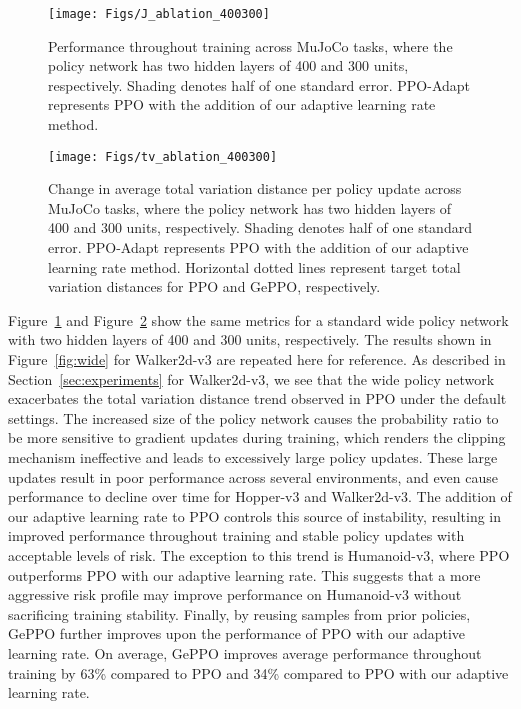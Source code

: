 \documentclass{article}
\begin{document}
\begin{figure}
\centering
\texttt{[image: Figs/J\_ablation\_400300]}
\caption{Performance throughout training across MuJoCo tasks, where the policy network has two hidden layers of 400 and 300 units, respectively. Shading denotes half of one standard error. PPO-Adapt represents PPO with the addition of our adaptive learning rate method.}\label{fig:J_ablation_400300}
\end{figure}

\begin{figure}
\centering
\texttt{[image: Figs/tv\_ablation\_400300]}
\caption{Change in average total variation distance per policy update across MuJoCo tasks, where the policy network has two hidden layers of 400 and 300 units, respectively. Shading denotes half of one standard error. PPO-Adapt represents PPO with the addition of our adaptive learning rate method. Horizontal dotted lines represent target total variation distances for PPO and GePPO, respectively.}\label{fig:tv_ablation_400300}
\end{figure}

Figure~\ref{fig:J_ablation_400300} and Figure~\ref{fig:tv_ablation_400300} show the same metrics for a standard wide policy network with two hidden layers of 400 and 300 units, respectively. The results shown in Figure~\ref{fig:wide} for Walker2d-v3 are repeated here for reference. As described in Section~\ref{sec:experiments} for Walker2d-v3, we see that the wide policy network exacerbates the total variation distance trend observed in PPO under the default settings. The increased size of the policy network causes the probability ratio to be more sensitive to gradient updates during training, which renders the clipping mechanism ineffective and leads to excessively large policy updates. These large updates result in poor performance across several environments, and even cause performance to decline over time for Hopper-v3 and Walker2d-v3. The addition of our adaptive learning rate to PPO controls this source of instability, resulting in improved performance throughout training and stable policy updates with acceptable levels of risk. The exception to this trend is Humanoid-v3, where PPO outperforms PPO with our adaptive learning rate. This suggests that a more aggressive risk profile may improve performance on Humanoid-v3 without sacrificing training stability. Finally, by reusing samples from prior policies, GePPO further improves upon the performance of PPO with our adaptive learning rate. On average, GePPO improves average performance throughout training by 63\% compared to PPO and 34\% compared to PPO with our adaptive learning rate.
\end{document}
